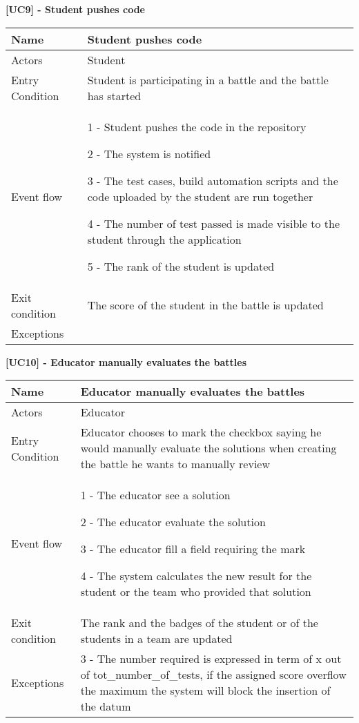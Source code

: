     \begin{table}[h]
    \textbf{[UC9] - Student pushes code }

    
      \centering
      \begin{tabular}{|p{3cm}|p{14cm}|}
        \hline
        Name & Student pushes code \\
        \hline
        Actors & Student \\
        \hline
        Entry Condition &  Student is participating in a battle and the battle has started \\
        \hline
        Event flow &  1 - Student pushes the code in the repository
        
        2 - The system is notified

        3 - The test cases, build automation scripts and the code uploaded by the student are run together

        4 - The number of test passed is made visible to the student through the application

        5 - The rank of the student is updated\\
        \hline
        Exit condition &  The score of the student in the battle is updated \\
        \hline
        Exceptions & 
        \\
        \hline
      \end{tabular}
      
    \end{table}

    \begin{table}[h]
    \textbf{[UC10] - Educator manually evaluates the battles }
    \clearpage 
      \centering
      \begin{tabular}{|p{3cm}|p{14cm}|}
        \hline
        Name & Educator manually evaluates the battles \\
        \hline
        Actors & Educator \\
        \hline
        Entry Condition &  Educator chooses to mark the checkbox saying he would manually evaluate the solutions when creating the battle he wants to manually review \\
        \hline
        Event flow &  1 - The educator see a solution
        
        2 - The educator evaluate the solution

        3 - The educator fill a field requiring the mark

        4 - The system calculates the new result for the student or the team who provided that solution
        \\

        \hline
        Exit condition &  The rank and the badges of the student or of the students in a team are updated \\
        \hline
        Exceptions & 3 - The number required is expressed in term of x out of tot\_number\_of\_tests, if the assigned score overflow the maximum the system will block the insertion of the datum
        \\
        \hline
      \end{tabular}
      \clearpage
    \end{table}

